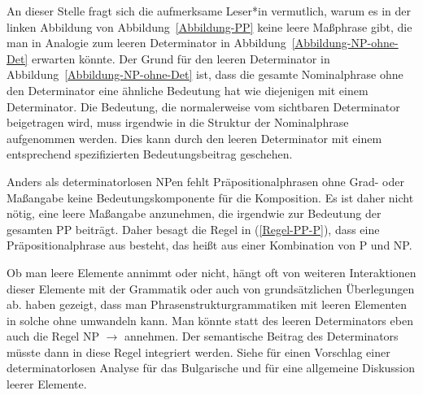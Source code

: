 An dieser Stelle fragt sich die aufmerksame Leser*in vermutlich, warum es in der linken Abbildung von
Abbildung~\ref{Abbildung-PP} keine leere Maßphrase gibt, die man in Analogie zum leeren Determinator in Abbildung~\ref{Abbildung-NP-ohne-Det} erwarten könnte.
Der Grund für den leeren Determinator in Abbildung~\ref{Abbildung-NP-ohne-Det} ist, dass die gesamte Nominalphrase
ohne den Determinator eine ähnliche Bedeutung hat wie diejenigen mit einem Determinator. Die Bedeutung, die normalerweise
vom sichtbaren Determinator beigetragen wird, muss irgendwie in die Struktur der Nominalphrase aufgenommen werden. Dies
kann durch den leeren Determinator mit einem entsprechend spezifizierten Bedeutungsbeitrag geschehen.

Anders als determinatorlosen NPen fehlt Präpositionalphrasen ohne Grad- oder Maßangabe
keine Bedeutungskomponente für die Komposition. Es ist daher nicht nötig, eine leere Maßangabe anzunehmen, die
irgendwie zur Bedeutung der gesamten PP beiträgt. Daher besagt die Regel in (\ref{Regel-PP-P}), dass eine
Präpositionalphrase aus \pbar besteht, das heißt aus einer Kombination von P und NP.

Ob man leere Elemente annimmt oder nicht, hängt oft von weiteren Interaktionen dieser Elemente mit
der Grammatik \citep*[Abschnitt~15.3.5]{SWB2003a} oder auch von grundsätzlichen Überlegungen ab. \citet{BHPS61a} haben
gezeigt, dass man Phrasenstrukturgrammatiken mit leeren Elementen in solche ohne umwandeln kann. Man
könnte statt des leeren Determinators eben auch die Regel NP $\to$ \nbar annehmen. Der semantische
Beitrag des Determinators müsste dann in diese Regel integriert werden. Siehe \citet{AMEgati} für
einen Vorschlag einer determinatorlosen Analyse für das Bulgarische und \citet[Kapitel~19]{MuellerGT-Eng5} für eine allgemeine Diskussion leerer Elemente.

